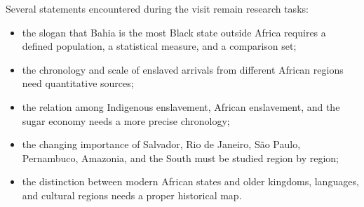 Several statements encountered during the
visit remain research tasks:

\begin{itemize}
\item the slogan that Bahia is the most
Black state outside Africa requires a
defined population, a statistical measure,
and a comparison set;
\item the chronology and scale of enslaved
arrivals from different African regions
need quantitative sources;
\item the relation among Indigenous
enslavement, African enslavement, and the
sugar economy needs a more precise
chronology;
\item the changing importance of Salvador,
Rio de Janeiro, S\~ao Paulo, Pernambuco,
Amazonia, and the South must be studied
region by region;
\item the distinction between modern
African states and older kingdoms,
languages, and cultural regions needs a
proper historical map.
\end{itemize}






